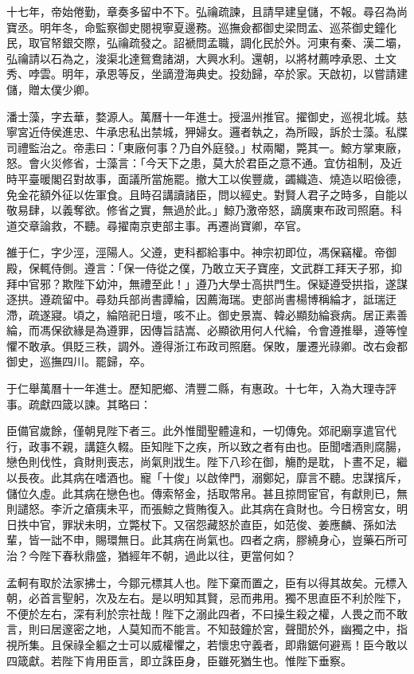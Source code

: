 \begin{pinyinscope}
十七年，帝始倦勤，章奏多留中不下。弘禴疏諫，且請早建皇儲，不報。尋召為尚寶丞。明年冬，命監察御史閱視寧夏邊務。巡撫僉都御史梁問孟、巡茶御史鐘化民，取官帑銀交際，弘禴疏發之。詔褫問孟職，調化民於外。河東有秦、漢二壩，弘禴請以石為之，浚渠北達鴛鴦諸湖，大興水利。還朝，以將材薦哱承恩、土文秀、哱雲。明年，承恩等反，坐謫澄海典史。投劾歸，卒於家。天啟初，以嘗請建儲，贈太僕少卿。

潘士藻，字去華，婺源人。萬曆十一年進士。授溫州推官。擢御史，巡視北城。慈寧宮近侍侯進忠、牛承忠私出禁城，狎婦女。邏者執之，為所毆，訴於士藻。私牒司禮監治之。帝恚曰：「東廠何事？乃自外庭發。」杖兩閹，斃其一。鯨方掌東廠，怒。會火災修省，士藻言：「今天下之患，莫大於君臣之意不通。宜仿祖制，及近時平臺暖閣召對故事，面議所當施罷。撤大工以俟豐歲，蠲織造、燒造以昭儉德，免金花額外征以佐軍食。且時召講讀諸臣，問以經史。對賢人君子之時多，自能以敬易肆，以義奪欲。修省之實，無過於此。」鯨乃激帝怒，謫廣東布政司照磨。科道交章論救，不聽。尋擢南京吏部主事。再遷尚寶卿，卒官。

雒于仁，字少涇，涇陽人。父遵，吏科都給事中。神宗初即位，馮保竊權。帝御殿，保輒侍側。遵言：「保一侍從之僕，乃敢立天子寶座，文武群工拜天子邪，抑拜中官邪？欺陛下幼沖，無禮至此！」遵乃大學士高拱門生。保疑遵受拱指，遂謀逐拱。遵疏留中。尋劾兵部尚書譚綸，因薦海瑞。吏部尚書楊博稱綸才，詆瑞迂滯，疏遂寢。頃之，綸陪祀日壇，咳不止。御史景嵩、韓必顯劾綸衰病。居正素善綸，而馮保欲緣是為遵罪，因傳旨詰嵩、必顯欲用何人代綸，令會遵推舉，遵等惶懼不敢承。俱貶三秩，調外。遵得浙江布政司照磨。保敗，屢遷光祿卿。改右僉都御史，巡撫四川。罷歸，卒。

于仁舉萬曆十一年進士。歷知肥鄉、清豐二縣，有惠政。十七年，入為大理寺評事。疏獻四箴以諫。其略曰：

臣備官歲餘，僅朝見陛下者三。此外惟聞聖體違和，一切傳免。郊祀廟享遣官代行，政事不親，講筵久輟。臣知陛下之疾，所以致之者有由也。臣聞嗜酒則腐腸，戀色則伐性，貪財則喪志，尚氣則戕生。陛下八珍在御，觴酌是耽，卜晝不足，繼以長夜。此其病在嗜酒也。寵「十俊」以啟倖門，溺鄭妃，靡言不聽。忠謀擯斥，儲位久虛。此其病在戀色也。傳索帑金，括取幣帛。甚且掠問宦官，有獻則已，無則譴怒。李沂之瘡痍未平，而張鯨之貲賄復入。此其病在貪財也。今日榜宮女，明日抶中官，罪狀未明，立斃杖下。又宿怨藏怒於直臣，如范俊、姜應麟、孫如法輩，皆一詘不申，賜環無日。此其病在尚氣也。四者之病，膠繞身心，豈藥石所可治？今陛下春秋鼎盛，猶經年不朝，過此以往，更當何如？

孟軻有取於法家拂士，今鄒元標其人也。陛下棄而置之，臣有以得其故矣。元標入朝，必首言聖躬，次及左右。是以明知其賢，忌而弗用。獨不思直臣不利於陛下，不便於左右，深有利於宗社哉！陛下之溺此四者，不曰操生殺之權，人畏之而不敢言，則曰居邃密之地，人莫知而不能言。不知鼓鐘於宮，聲聞於外，幽獨之中，指視所集。且保祿全軀之士可以威權懼之，若懷忠守義者，即鼎鋸何避焉！臣今敢以四箴獻。若陛下肯用臣言，即立誅臣身，臣雖死猶生也。惟陛下垂察。


\end{pinyinscope}
